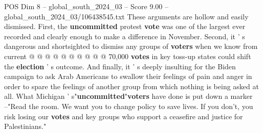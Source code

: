 \begin{textsample}{POS Dim 8 – global\_south\_2024\_03 – Score 9.00 – global\_south\_2024\_03/106438545.txt}
These arguments are hollow and easily dismissed.
First, the \textbf{uncommitted} protest \textbf{vote} was one of the largest ever recorded and clearly enough to make a difference in November.
Second, it ' s dangerous and shortsighted to dismiss any groups of \textbf{voters} when we know from current @ @ @ @ @ @ @ @ @ @ 70,000 \textbf{votes} in key toss-up states could shift the \textbf{election} ' s outcome.
And finally, it ' s deeply insulting for the Biden campaign to ask Arab Americans to swallow their feelings of pain and anger in order to spare the feelings of another group from which nothing is being asked at all.
What Michigan ' s"\textbf{uncommitted}"\textbf{voters} have done is put down a marker --"Read the room.
We want you to change policy to save lives.
If you don't, you risk losing our \textbf{votes} and key groups who support a ceasefire and justice for Palestinians."

\end{textsample}
